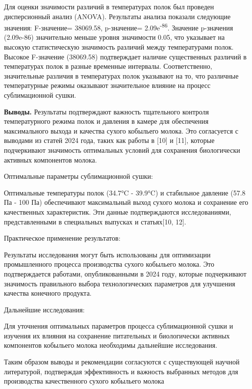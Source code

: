 \begin{multicols}{2}

Для оценки значимости различий в температурах полок был проведен
дисперсионный анализ (ANOVA). Результаты анализа показали следующие
значения: F-значение= 38069.58, p-значение= 2.09e\textsuperscript{-86}.
Значение p-значения (2.09e-86) значительно меньше уровня значимости
0.05, что указывает на высокую статистическую значимость различий между
температурами полок. Высокое F-значение (38069.58) подтверждает наличие
существенных различий в температурах полок в разные временные интервалы.
Соответственно, значительные различия в температурах полок указывают на
то, что различные температурные режимы оказывают значительное влияние на
процесс сублимационной сушки.

{\bfseries Выводы.} Результаты подтверждают важность тщательного контроля
температурного режима полок и давления в камере для обеспечения
максимального выхода и качества сухого кобыльего молока. Это согласуется
с выводами из статей 2024 года, таких как работы в {[}10{]} и {[}11{]},
которые подчеркивают значимость оптимальных условий для сохранения
биологически активных компонентов молока.

Оптимальные параметры сублимационной сушки:

Оптимальные температуры полок (34.7°C - 39.9°C) и стабильное давление
(57.8 Па - 100 Па) обеспечивают максимальный выход сухого молока и
сохранение его качественных характеристик. Эти данные подтверждаются
исследованиями, представленными в специальных выпусках и статьях{[}10,
12{]}.

Практическое применение результатов:

Результаты исследования могут быть использованы для оптимизации
промышленного процесса производства сухого кобыльего молока. Это
подтверждается работами, опубликованными в 2024 году, которые
подчеркивают значимость правильного выбора технологических параметров
для улучшения качества конечного продукта.

Дальнейшие исследования:

Для уточнения оптимальных параметров процесса сублимационной сушки и
изучения их влияния на сохранение питательных и биологически активных
компонентов кобыльего молока необходимы дальнейшие исследования.

Таким образом выводы и рекомендации согласуются с существующей научной
литературой, подтверждая эффективность и важность выбранных методов для
производства качественного сухого кобыльего молока


\end{multicols}
